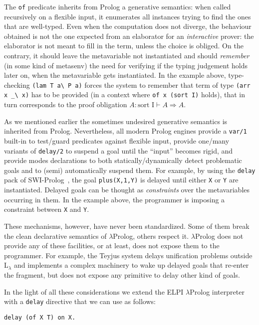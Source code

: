 \documentclass{easychair}
\begin{document}
The \verb+of+ predicate inherits from Prolog a generative semantics:
when called recursively on a flexible input, it enumerates all
instances trying to find the ones that are well-typed. Even when 
the computation does not diverge, the behaviour obtained is not the one
expected from an elaborator for an \emph{interactive} prover: the
elaborator is not meant to fill in the term, unless the choice is
obliged. On the contrary, it should leave the metavariable not
instantiated and should \emph{remember} (in some kind of metasenv) the need for verifying if the
typing judgement holds later on, when the metavariable gets instantiated. In
the example above, type-checking \verb+(lam T a\ P a)+ forces the
system to remember that term of type \verb+(arr x _\ x)+ has to be
provided (in a context where \verb+of x (sort I)+ holds), that in turn
corresponds to the proof obligation $A : \mbox{sort I} \vdash A \Rightarrow A $.

As we mentioned earlier the sometimes undesired generative semantics
is inherited from Prolog.
Nevertheless, all modern Prolog engines provide a \verb+var/1+
built-in to test/guard predicates against flexible input, provide
one/many variants of \verb+delay/2+ to suspend a goal until the ``input''
becomes rigid, and provide modes declarations to both
statically/dynamically detect problematic goals and to (semi)
automatically suspend them.
For example, by using the \verb+delay+ pack of SWI-Prolog~\cite{SWI}, the goal
\verb+plus(X,1,Y)+ is delayed until either \verb+X+ or \verb+Y+ are
instantiated.  Delayed goals can be thought as \emph{constraints} over the
metavariables occurring in them. In the example above, the programmer is
imposing a constraint between \verb+X+ and \verb+Y+.

These mechanisms, however, have never been standardized. Some of them
break the clean declarative semantics of $\lambda$Prolog, others
respect it. $\lambda$Prolog does not provide any of these facilities,
or at least, does not expose them to the programmer. For example, the Teyjus
system delays unification problems outside L$_\lambda$ and implements a complex
machinery to wake up delayed goals that re-enter the fragment, but does not
expose any primitive to delay other kind of goals.

In the light of all these considerations we extend the ELPI
$\lambda$Prolog interpreter with a \verb+delay+ directive that we can use
as follows:

\begin{Verbatim}
delay (of X T) on X.
\end{Verbatim}
\end{document}
